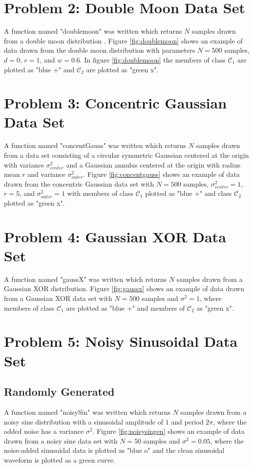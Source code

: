 \documentclass[conference]{IEEEtran}
\begin{document}
\section{Problem 2: Double Moon Data Set}
A function named "doublemoon" was written which returns $N$ samples drawn from a double moon distribution \cite{b2}. Figure \ref{fig:doublemoon} shows an example of data drawn from the double moon distribution with parameters $N=500$ samples, $d=0$, $r=1$, and $w=0.6$. In figure \ref{fig:doublemoon} the members of class $\mathscr{C}_1$ are plotted as "blue +" and $\mathscr{C}_2$ are plotted as "green x".

\section{Problem 3: Concentric Gaussian Data Set}
A function named "concentGauss" was written which returns $N$ samples drawn from a data set consisting of a circular symmetric Gaussian centered at the origin with variance $\sigma^2_{center}$ and a Gaussian annulus centered at the origin with radius mean $r$ and variance $\sigma^2_{outer}$. Figure \ref{fig:concentgauss} shows an example of data drawn from the concentric Gaussian data set with $N=500$ samples, $\sigma^2_{center}=1$, $r=5$, and $\sigma^2_{outer}=1$ with members of class $\mathscr{C}_1$ plotted as "blue +" and class $\mathscr{C}_2$ plotted as "green x". 

\section{Problem 4: Gaussian XOR Data Set}
A function named "gaussX" was written which returns $N$ samples drawn from a Gaussian XOR distribution. Figure \ref{fig:gaussx} shows an example of data drawn from a Gaussian XOR data set with $N=500$ samples and $\sigma^2=1$, where members of class $\mathscr{C}_1$ are plotted as "blue +" and members of $\mathscr{C}_2$ as "green x".

\section{Problem 5: Noisy Sinusoidal Data Set}
\subsection{Randomly Generated}\label{section:randomgen}
A function named "noisySin" was written which returns $N$ samples drawn from a noisy sine distribution with a sinusoidal amplitude of $1$ and period $2\pi$, where the added noise has a variance $\sigma^2$. Figure \ref{fig:noisysingen} shows an example of data drawn from a noisy sine data set with $N=50$ samples and $\sigma^2=0.05$, where the noise-added sinusoidal data is plotted as "blue o" and the clean sinusoidal waveform is plotted as a green curve.
\end{document}
